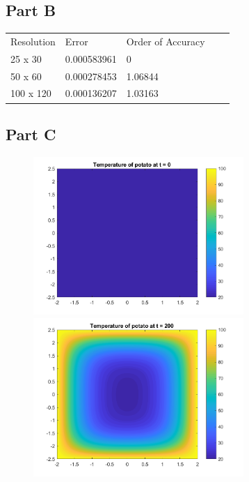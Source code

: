 \documentclass[12pt]{article}
\begin{document}
\subsection*{Part B}
\begin{table}[]
\centering
\label{p1_table}
\begin{tabular}{|l|l|l|ll}
\cline{1-3}
Resolution & Error       & Order of Accuracy &  &  \\ \cline{1-3}
25 x 30    & 0.000583961 & 0                 &  &  \\ \cline{1-3}
50 x 60    & 0.000278453 & 1.06844           &  &  \\ \cline{1-3}
100 x 120  & 0.000136207 & 1.03163           &  &  \\ \cline{1-3}
\end{tabular}
\end{table}
\subsection*{Part C}

\begin{figure}[htb]%
    \centering
    {\includegraphics[width=8cm]{Problem1_fig1.png}}%
    \qquad
    {\includegraphics[width=8cm]{Problem1_fig2.png}}%
    \label{fig:p1_fig1-2}%
\end{figure}
\end{document}
